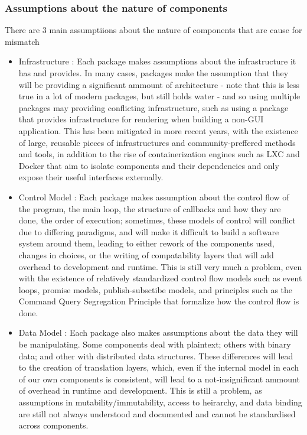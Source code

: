 \documentclass[14pt]{article}
\begin{document}
\subsubsection{Assumptions about the nature of components}
There are 3 main assumptiions about the nature of components that
are cause for mismatch
\begin{itemize}
  \item Infrastructure : Each package makes assumptions about the infrastructure it has and provides. In many cases, packages make the assumption that they will be providing a significant ammount of architecture - note that this is less true in a lot of modern packages, but still holds water - and so using multiple packages may providing conflicting infrastructure, such as using a package that provides infrastructure for rendering when building a non-GUI application. This has been mitigated in more recent years, with the existence of large, reusable pieces of infrastructures and community-preffered methods and tools, in addition to the rise of containerization engines such as LXC and Docker that aim to isolate components and their dependencies and only expose their useful interfaces externally.
  \item Control Model : Each package makes assumption about the control flow of the program, the main loop, the structure of callbacks and how they are done, the order of execution; sometimes, these models of control will conflict due to differing paradigms, and will make it difficult to build a software system around them, leading to either rework of the components used, changes in choices, or the writing of compatability layers that will add overhead to development and runtime. This is still very much a problem,  even with the existence of relatively standardized control flow models such as event loops, promise models, publish-subsctibe models, and principles such as the Command Query Segregation Principle that formalize how the control flow is done.
  \item Data Model : Each package also makes assumptions about the data they will be manipulating. Some components deal with plaintext; others with binary data; and other with distributed data structures. These differences will lead to the creation of translation layers, which, even if the internal model in each of our own components is consistent, will lead to a not-insignificant ammount of overhead in runtime and development.
This is still a problem, as assumptions in mutability/immutability, access to heirarchy, and data binding are still not always understood and documented and cannot be standardised across components.
\end{itemize}
\newpage
\end{document}
